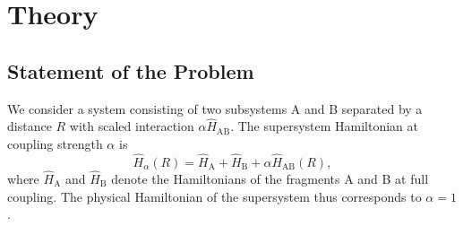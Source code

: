 \documentclass[twoside,twocolumn,9pt]{article}
\begin{document}

\section{Theory}

\subsection{Statement of the Problem}

We consider a system consisting of two subsystems A and B separated by a
distance $R$ with scaled interaction $\alpha \hat{H}_{\text{AB}}$. The
supersystem Hamiltonian at coupling strength $\alpha$ is
\begin{equation}
  \hat{H}_{\alpha}(R) = \hat{H}_{\text{A}} + \hat{H}_{\text{B}} + \alpha
  \hat{H}_{\text{AB}}(R),
\end{equation}
where $\hat{H}_{\text{A}}$ and $\hat{H}_{\text{B}}$ denote the
Hamiltonians of the fragments A and B at full coupling. The physical
Hamiltonian of the supersystem thus corresponds to $\alpha = 1$.
\end{document}
